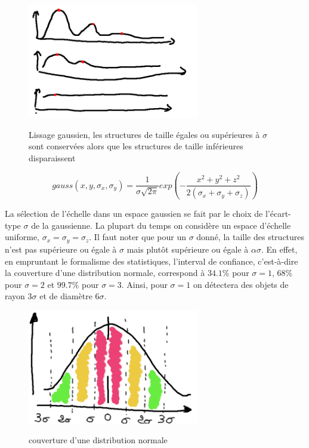 \begin{figure}
  \centering
  \includegraphics[height=5cm]{Images/gaussian_smoothing.png}
  \label{fig:gaussian_smoothing}
  \caption{Lissage gaussien, les structures de taille égales ou supérieures à $\sigma$ sont conservées alors que les structures de taille inférieures disparaissent}
\end{figure}

\begin{equation}
  gauss(x,y,\sigma_{x},\sigma_{y}) = \frac{1}{ \sigma\sqrt{2\pi} }exp(-\frac{x^2 + y^2 + z^2}{2(\sigma_{x}+ \sigma_{y}+ \sigma_{z}) })
\end{equation}

La sélection de l'échelle dans un espace gaussien se fait par le choix de l'écart-type $\sigma$ de la gaussienne. La plupart du temps on considère un espace d'échelle uniforme, $\sigma_x = \sigma_y = \sigma_z$. Il faut noter que pour un $\sigma$ donné, la taille des structures n'est pas supérieure ou égale à $\sigma$ mais plutôt supérieure ou égale à $\alpha\sigma$. En effet, en empruntant le formalisme des statistiques, l'interval de confiance, c'est-à-dire la couverture d'une distribution normale, correspond à $34.1\%$ pour $\sigma=1$, $68\%$ pour $\sigma=2$ et $99.7\%$ pour $\sigma=3$. Ainsi, pour $\sigma=1$ on détectera des objets de rayon $3\sigma$ et de diamètre $6\sigma$.  

\begin{figure}
  \centering
  \includegraphics[height=5cm]{Images/normal_distribution_probability_coverage.png}
  \label{fig:normal_distribution_probability_coverage}
  \caption{couverture d'une distribution normale}
\end{figure}

